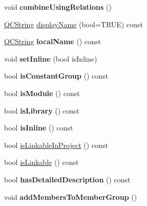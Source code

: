\begin{DoxyCompactItemize}
\item 
\mbox{\label{class_namespace_def_a3dcd4b6bac35e19712eac238f9f6b392}} 
void {\bfseries combine\+Using\+Relations} ()
\item 
\mbox{\hyperlink{class_q_c_string}{Q\+C\+String}} \mbox{\hyperlink{class_namespace_def_a7893c9a6525e3fc406ddfa9f9dd031f1}{display\+Name}} (bool=T\+R\+UE) const
\item 
\mbox{\label{class_namespace_def_add54a4b2a98258a642ef6ac23f6d4210}} 
\mbox{\hyperlink{class_q_c_string}{Q\+C\+String}} {\bfseries local\+Name} () const
\item 
\mbox{\label{class_namespace_def_a48333078b578ceae652a758d7590f203}} 
void {\bfseries set\+Inline} (bool is\+Inline)
\item 
\mbox{\label{class_namespace_def_a3f241a3b8138c0f234cca92227f99aa5}} 
bool {\bfseries is\+Constant\+Group} () const
\item 
\mbox{\label{class_namespace_def_a36d4f795488bbec6b06eee7d236f8748}} 
bool {\bfseries is\+Module} () const
\item 
\mbox{\label{class_namespace_def_a08fafa07f58c8717e1973b0870f9a86f}} 
bool {\bfseries is\+Library} () const
\item 
\mbox{\label{class_namespace_def_aced84a52887a8e42ef6ec21cdc09b361}} 
bool {\bfseries is\+Inline} () const
\item 
bool \mbox{\hyperlink{class_namespace_def_a3d9655e111c40aa7005ded973d6a8e89}{is\+Linkable\+In\+Project}} () const
\item 
bool \mbox{\hyperlink{class_namespace_def_a733e21e2422707a338b42b2c4e2ab37b}{is\+Linkable}} () const
\item 
\mbox{\label{class_namespace_def_acfec539c3e24bbe88ddd549082ccf6db}} 
bool {\bfseries has\+Detailed\+Description} () const
\item 
\mbox{\label{class_namespace_def_a7843352a55567c1ccb4b96a86bcf54e2}} 
void {\bfseries add\+Members\+To\+Member\+Group} ()

\end{DoxyCompactItemize}
